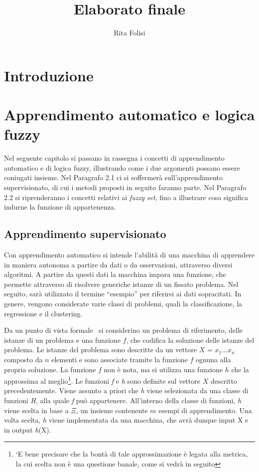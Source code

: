 \documentclass[11pt,  oneside, openany]{book}
\title{Elaborato finale}
\date{}
\author{Rita Folisi}
\begin{document}

  \begin{titlepage}
    
    \tableofcontents
    \thispagestyle{empty}
  \end{titlepage}




	\chapter{Introduzione}

	\chapter{Apprendimento automatico e logica fuzzy}
Nel seguente capitolo si passano in rassegna i concetti di apprendimento automatico e di logica fuzzy, illustrando come i due argomenti possano essere coniugati insieme. Nel Paragrafo 2.1 ci si soffermerà sull'apprendimento supervisionato, di cui i metodi proposti in seguito faranno parte. Nel Paragrafo 2.2 si riprenderanno i concetti relativi ai \textit {fuzzy set}, fino a illustrare cosa significa indurne la funzione di appartenenza. 

	\section{Apprendimento supervisionato}

Con apprendimento automatico si intende l'abilità di una macchina di apprendere in maniera autonoma a partire da dati o da osservazioni, attraverso diversi algoritmi. A partire da questi dati la macchina impara una funzione, che permette attraverso di risolvere generiche istanze di un fissato problema. Nel seguito, sarà utilizzato il termine ``esempio'' per riferirsi ai dati sopracitati. In genere, vengono considerate varie classi di problemi, quali la classificazione, la regressione e il clustering. 

Da un punto di vista formale~\cite {mlstanford} si considerino un problema di riferimento, delle istanze di un problema e una funzione  $f$, che codifica la soluzione delle istanze del problema. Le istanze del problema sono descritte da un vettore  $X$ = $x_1...x_n$ composto da $n$ elementi e sono associate tramite la funzione $f$ ognuna alla propria soluzione. La funzione $f$ non è nota, ma si utilizza una funzione $h$ che la approssima al meglio\footnote{`E bene precisare che la bontà di tale approssimazione è legata alla metrica, la cui scelta non è una questione banale, come si vedrà in seguito}.  Le funzioni \textit {f} e \textit {h} sono definite sul vettore $X$ descritto precedentemente. Viene assunto a priori che \textit {h} viene selezionata da una classe di funzioni \textit {H}, alla quale \textit {f} può appartenere.  All'interno della classe di funzioni, \textit {h} viene scelta in base a $\Xi$, un insieme contenente $m$ esempi di apprendimento. Una volta scelta, \textit {h} viene implementata da una macchina, che avrà dunque input X e in output \textit {h}(X). 
\end{document}
